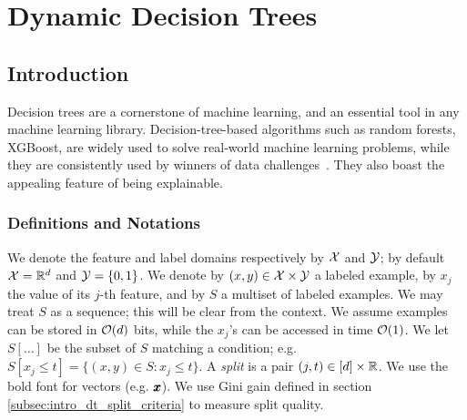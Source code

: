\chapter{Dynamic Decision Trees}
\section{Introduction}
Decision trees are a cornerstone of machine learning, and an essential tool in any machine learning library. Decision-tree-based algorithms such as random forests, XGBoost, are widely used to solve real-world machine learning problems, while they are consistently used by winners of data challenges~\cite{kaggle}. They also boast the appealing feature of being explainable.

\subsection{Definitions and Notations}
We denote the feature and label domains respectively by $\mathcal{X}$ and $\mathcal{Y}$; by default $\mathcal{X}=\mathbb{R}^d$ and $\mathcal{Y}=\{0,1\}$. We denote by $(x,y) \in \mathcal{X} \times \mathcal{Y}$ a labeled example, by $x_j$ the value of its $j$-th feature, and by $S$ a multiset of labeled examples. We may treat $S$ as a sequence; this will be clear from the context. We assume examples can be stored in $\mathcal{O}(d)$ bits, while the $x_j$'s can be accessed in time $\mathcal{O}(1)$.
We let $S[\ldots]$ be the subset of $S$ matching a condition; e.g. $S[x_j \le t] = \{(x,y) \in S : x_j \le t\}$. A \emph{split} is a pair $(j,t) \in [d] \times \mathbb{R}$. We use the bold font for vectors (e.g.  $\pmb{x}$). We use Gini gain defined in section \ref{subsec:intro_dt_split_criteria} to measure split quality.

